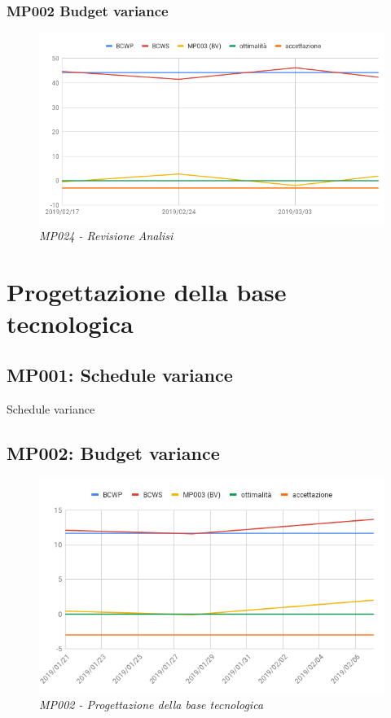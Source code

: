 \subsubsection{MP002 Budget variance}
\begin{figure} [h]
    \centering
	\includegraphics[scale=0.5]{./images/re.png}
	\caption{\textit{MP024 - Revisione Analisi}}\label{}
\end{figure}

\section{Progettazione della base tecnologica}
\label{progettazione}
\subsection{MP001: Schedule variance}
Schedule variance
\pagebreak
\subsection{MP002: Budget variance}
\begin{figure} [h]
    \centering
	\includegraphics[scale=0.5]{./images/prog.png}
	\caption{\textit{MP002 - Progettazione della base tecnologica}}\label{}
\end{figure}

